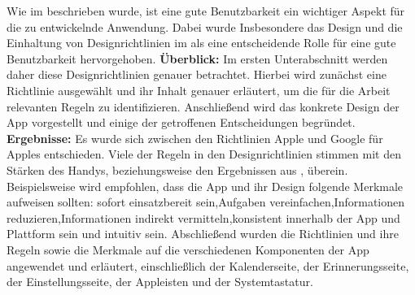
Wie im  beschrieben wurde, ist eine gute Benutzbarkeit ein wichtiger Aspekt für die zu entwickelnde Anwendung. Dabei wurde Insbesondere das Design und die Einhaltung von Designrichtlinien im  als eine entscheidende Rolle für eine gute Benutzbarkeit hervorgehoben.\newline%
\textbf{Überblick:} %
	Im ersten Unterabschnitt werden daher diese Designrichtlinien genauer betrachtet. Hierbei wird zunächst eine Richtlinie ausgewählt und ihr Inhalt genauer erläutert, um die für die Arbeit relevanten Regeln zu identifizieren.  %
	Anschließend wird das konkrete Design der App vorgestellt und einige der getroffenen Entscheidungen begründet.\newline%
\textbf{Ergebnisse:}
Es wurde sich zwischen den Richtlinien Apple und Google für Apples entschieden.
Viele der Regeln in den Designrichtlinien stimmen mit den Stärken des Handys, beziehungsweise den Ergebnissen aus , überein. Beispielsweise wird empfohlen, dass die App und ihr Design folgende Merkmale aufweisen sollten: \glqq sofort einsatzbereit sein\grqq{},\glqq Aufgaben vereinfachen\grqq{},\glqq Informationen reduzieren\grqq{},\glqq Informationen indirekt vermitteln\grqq{},\glqq konsistent innerhalb der App und Plattform sein\grqq{} und \glqq intuitiv sein\grqq{}.
Abschließend wurden die Richtlinien und ihre Regeln sowie die Merkmale auf die verschiedenen Komponenten der App angewendet und erläutert, einschließlich der Kalenderseite, der Erinnerungsseite, der Einstellungsseite, der Appleisten und der Systemtastatur.%
%
%
%
%
%
%
